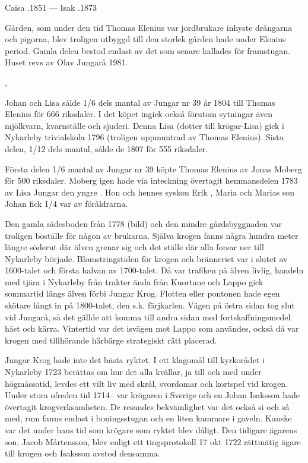 Caisa .1851  ---  Isak .1873

Gården, som under den tid Thomas Elenius var jordbrukare inhyste drängarna och pigorna, blev troligen utbyggd till den storlek gården hade under Elenius period. Gamla delen bestod endast av det som senare kallades för framstugan. Huset revs av Olav Jungarå 1981.



, 

Johan och Lisa sålde 1/6 dels mantal av Jungar nr 39 år 1804 till Thomas Elenius för 666 riksdaler. I det köpet ingick också förutom sytningar även mjölkvarn, kvarnställe och sjuderi. Denna Lisa (dotter till krögar-Lisa) gick i Nykarleby trivialskola 1796 (troligen uppmuntrad av Thomas Elenius). Sista delen, 1/12 dels mantal, sålde de 1807 för 555 riksdaler.

Första delen 1/6 mantal av Jungar nr 39 köpte Thomas Elenius av Jonas Moberg för 500 riksdaler. Moberg igen hade via 	inteckning övertagit hemmansdelen 1783 av Lisa Jungar den yngre . Hon och hennes syskon Erik , Maria  och Marias son Johan fick 1/4 var av föräldrarna.

Den gamla sädesboden från 1778 (bild) och den mindre gårdsbyggnaden var troligen boställe för någon av brukarna. Själva krogen fanns några hundra meter längre söderut där älven grenar sig och det ställe där alla forsar ner till Nykarleby började. Blomstringstiden för krogen och bränneriet var i slutet av 1600-talet och första halvan av 1700-talet. Då var trafiken på älven livlig, handeln med tjära i Nykarleby från trakter ända från Kuortane och Lappo gick sommartid längs älven förbi Jungar Krog. Flotten eller pontonen hade egen skötare långt in på 1800-talet, den s.k. färjkarlen. Vägen på östra sidan tog slut vid Jungarå, så det gällde att komma till andra sidan med fortskaffningsmedel häst och kärra. Vintertid var det isvägen mot Lappo som användes, också då var krogen med tillhörande härbärge strategiskt rätt placerad.


Jungar Krog hade inte det bästa ryktet. I ett klagomål till kyrkorådet i Nykarleby 1723 berättas om hur det alla kvällar, ja till och med under högmässotid, levdes ett vilt liv med skrål, svordomar och kortspel vid krogen. Under stora ofreden tid 1714-- var krögaren i Sverige och en Johan Isaksson hade övertagit krogverksamheten. De resandes bekvämlighet var det också si och så med, rum fanns endast i boningsstugan och en liten kammare i gaveln. Kanske var det under hans tid som krögare som ryktet blev dåligt. Den tidigare ägarens son, Jacob Mårtensson, blev enligt ett tingsprotokoll 17 okt 1722 rättmätig ägare till krogen och Isaksson avstod densamma.

